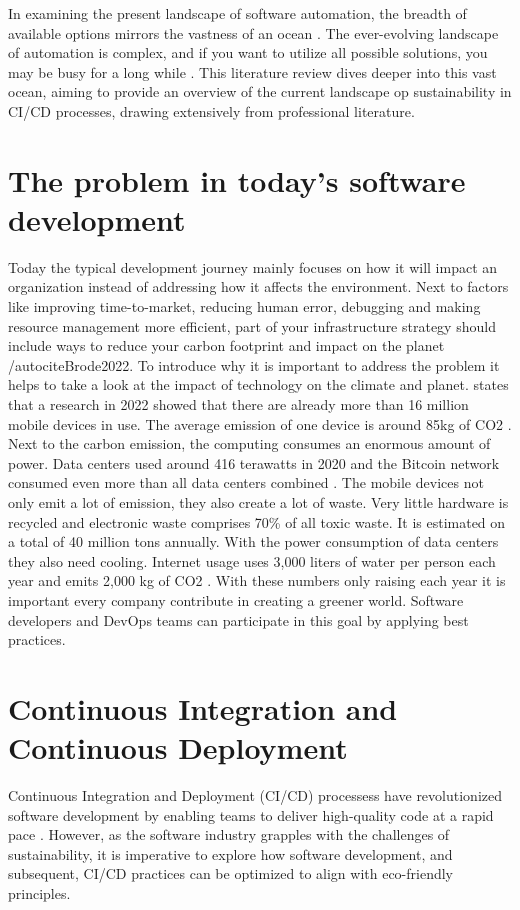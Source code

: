 
In examining the present landscape of software automation, the breadth of available options mirrors the vastness of an ocean \autocite{King2019}.
The ever-evolving landscape of automation is complex, and if you want to utilize all possible solutions, you may be busy for a long while \autocite{King2019}.
This literature review dives deeper into this vast ocean, aiming to provide an overview of the current landscape op sustainability in CI/CD processes, drawing extensively from professional literature.



\section{The problem in today's software development}
Today the typical development journey mainly focuses on how it will impact an organization instead of addressing how it affects the environment. Next to factors like improving time-to-market, reducing human error, debugging and making resource management more efficient, part of your infrastructure strategy should include ways to reduce your carbon footprint and impact on the planet 
/autocite{Brode2022}. 
To introduce why it is important to address the problem it helps to take a look at the impact of technology on the climate and planet. \textcite{Brode2022} states that a research in 2022 showed that there are already more than 16 million mobile devices in use. The average emission of one device is around 85kg of CO2 \autocite{Six2023}. Next to the carbon emission, the computing consumes an enormous amount of power. Data centers used around 416 terawatts in 2020 and the Bitcoin network consumed even more than all data centers combined \textcite{Brode2022}. 
 The mobile devices not only emit a lot of emission, they also create a lot of waste. Very little hardware is recycled and electronic waste comprises 70\% of all toxic waste. It is estimated on a total of 40 million tons annually. With the power consumption of data centers they also need cooling. Internet usage uses 3,000 liters of water per person each year and emits 2,000 kg of CO2 \autocite{Brode2022}.
With these numbers only raising each year it is important every company contribute in creating a greener world. Software developers and DevOps teams can participate in this goal by applying best practices. 



\section{Continuous Integration and Continuous Deployment}
Continuous Integration and Deployment (CI/CD) processess have revolutionized software development by enabling teams to deliver high-quality code at a rapid pace \autocite{Sacolick2024}.
However, as the software industry grapples with the challenges of sustainability, it is imperative to explore how software development, and subsequent, CI/CD practices can be optimized to align with eco-friendly principles.

